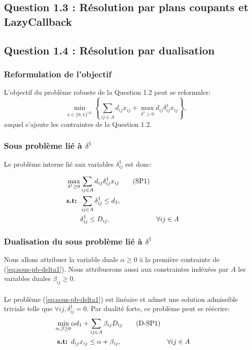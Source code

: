 \documentclass{article}
\begin{document}
\subsection{Question 1.3 : Résolution par plans coupants et LazyCallback}

\subsection{Question 1.4 : Résolution par dualisation}

\subsubsection{Reformulation de l'objectif}

L'objectif du problème robuste de la Question 1.2 peut se reformuler:
$$ \min_{x \in \{0,1\}^{|A|}} \left\{ \sum_{ij \in A} d_{ij} x_{ij} + \max_{\delta^{1} \geq 0} d_{ij} \delta_{ij}^{1} x_{ij} \right\},$$
auquel s'ajoute les contraintes de la Question 1.2.

\subsubsection{Sous problème lié à $\delta^{1}$}

Le problème interne lié aux variables $\delta^{1}_{ij}$ est donc:

\begin{align}
  \max_{\delta^{1}\geq 0} & \sum_{ij \in A} d_{ij} \delta_{ij}^{1} x_{ij} \tag{SP1} \label{eq:sous-pb-delta1}  \\
  \textbf{s.t: } &\sum_{ij \in A} \delta_{ij}^{1} \leq d_1, \notag \\
  &\delta_{ij}^{1} \leq D_{ij}, && \forall ij \in A \notag
\end{align}

\subsubsection{Dualisation du sous problème lié à $\delta^{1}$}

Nous allons attribuer la variable duale $\alpha \geq 0$ à la première contrainte de (\ref{eq:sous-pb-delta1}). Nous attribuerons aussi aux constraintes indéxées par $A$ les variables duales $\beta_{ij} \geq 0$.
\\
\\
Le problème (\ref{eq:sous-pb-delta1}) est linéaire et admet une solution admissible triviale telle que $\forall ij, \delta^{1}_{ij} = 0$. Par dualité forte, ce problème peut se réécrire:
\begin{align}
  \min_{\alpha, \beta \geq 0} & \alpha d_1  + \sum_{ij \in A} \beta_{ij} D_{ij} \tag{D-SP1} \label{eq:dual-sous-pb-delta1}  \\
  \textbf{s.t: } &d_{ij} x_{ij} \leq \alpha + \beta_{ij}, && \forall ij \in A \notag
\end{align}
\end{document}
